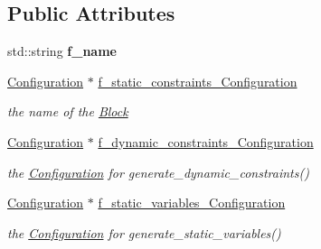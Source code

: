 \subsection*{Public Attributes}
\begin{DoxyCompactItemize}
\item 
\mbox{\label{class_s_m_spp__di__unipi__it_1_1_block_config_a7c33ab5d924071ba01a41e9ca8b0c170}} 
std\+::string {\bfseries f\+\_\+name}
\item 
\mbox{\hyperlink{class_s_m_spp__di__unipi__it_1_1_configuration}{Configuration}} $\ast$ \mbox{\hyperlink{class_s_m_spp__di__unipi__it_1_1_block_config_ab496062cc113cfd83c7fbdcbaf2cb080}{f\+\_\+static\+\_\+constraints\+\_\+\+Configuration}}
\begin{DoxyCompactList}\small\item\em the name of the \mbox{\hyperlink{class_s_m_spp__di__unipi__it_1_1_block}{Block}} \end{DoxyCompactList}\item 
\mbox{\label{class_s_m_spp__di__unipi__it_1_1_block_config_a43dde1603a406da568a3c84588a44b19}} 
\mbox{\hyperlink{class_s_m_spp__di__unipi__it_1_1_configuration}{Configuration}} $\ast$ \mbox{\hyperlink{class_s_m_spp__di__unipi__it_1_1_block_config_a43dde1603a406da568a3c84588a44b19}{f\+\_\+dynamic\+\_\+constraints\+\_\+\+Configuration}}
\begin{DoxyCompactList}\small\item\em the \mbox{\hyperlink{class_s_m_spp__di__unipi__it_1_1_configuration}{Configuration}} for generate\+\_\+dynamic\+\_\+constraints() \end{DoxyCompactList}\item 
\mbox{\label{class_s_m_spp__di__unipi__it_1_1_block_config_a66b3ea640f64267d31a5458c4a2f3fdc}} 
\mbox{\hyperlink{class_s_m_spp__di__unipi__it_1_1_configuration}{Configuration}} $\ast$ \mbox{\hyperlink{class_s_m_spp__di__unipi__it_1_1_block_config_a66b3ea640f64267d31a5458c4a2f3fdc}{f\+\_\+static\+\_\+variables\+\_\+\+Configuration}}
\begin{DoxyCompactList}\small\item\em the \mbox{\hyperlink{class_s_m_spp__di__unipi__it_1_1_configuration}{Configuration}} for generate\+\_\+static\+\_\+variables() \end{DoxyCompactList}\item 

\end{DoxyCompactItemize}
